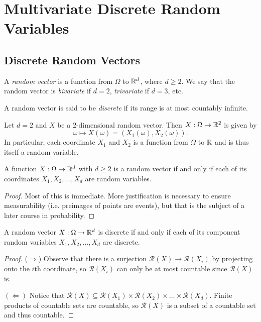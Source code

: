 \chapter{Multivariate Discrete Random Variables}

\section{Discrete Random Vectors}
\begin{definition}
  A \emph{random vector} is a function
  from $\Omega$ to $\mathbb{R}^d$, where $d \ge 2$. We say
  that the random vector is
  \emph{bivariate} if $d = 2$,
  \emph{trivariate} if $d = 3$, etc.
\end{definition}

\begin{definition}
  A random vector is said to be \emph{discrete}
  if its range is at most countably infinite.
\end{definition}

\begin{example}
  Let $d = 2$ and $X$ be a $2$-dimensional
  random vector. Then $X : \Omega \to \mathbb{R}^2$ is
  given by
  \[
    \omega \mapsto X(\omega) = (X_1(\omega), X_2(\omega)).
  \]
  In particular, each coordinate $X_1$ and
  $X_2$ is a function from $\Omega$ to $\mathbb{R}$ and
  is thus itself a random variable.
\end{example}

\begin{prop}
  A function $X : \Omega \to \mathbb{R}^d$ with $d \ge 2$
  is a random vector if and only if each of its
  coordinates $X_1, X_2, \dots, X_d$ are random
  variables.
\end{prop}

\begin{proof}
  Most of this is immediate. More justification is
  necessary to ensure measurability (i.e. preimages
  of points are events), but that is
  the subject of a later course in probability.
\end{proof}

\begin{prop}
  A random vector $X : \Omega \to \mathbb{R}^d$ is discrete
  if and only if each of its component random
  variables $X_1, X_2, \dots, X_d$ are discrete.
\end{prop}
\begin{proof}
  ($\Rightarrow$) Observe that there is a
  surjection $\mathcal{R}(X) \to \mathcal{R}(X_i)$
  by projecting onto the $i$th coordinate, so
  $\mathcal{R}(X_i)$ can only be at most countable
  since $\mathcal{R}(X)$ is.

  $(\Leftarrow)$ Notice that
  $\mathcal{R}(X) \subseteq \mathcal{R}(X_1) \times
  \mathcal{R}(X_2) \times \dots \times \mathcal{R}(X_d)$.
  Finite products of countable sets are countable,
  so $\mathcal{R}(X)$ is a subset of a countable
  set and thus countable.
\end{proof}

